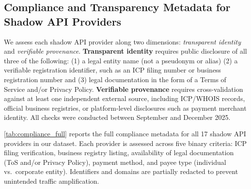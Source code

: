 \documentclass[letterpaper,twocolumn,10pt]{article}
\begin{document}

\subsection{Compliance and Transparency Metadata for Shadow API Providers}
\label{appendix:anonymized_apis}

We assess each shadow API provider along two dimensions: \emph{transparent identity} and \emph{verifiable provenance}.
\textbf{Transparent identity} requires public disclosure of all three of the following: (1) a legal entity name (not a pseudonym or alias) (2) a verifiable registration identifier, such as an ICP filing number or business registration number and (3) legal documentation in the form of a Terms of Service and/or Privacy Policy.
\textbf{Verifiable provenance} requires cross-validation against at least one independent external source, including ICP/WHOIS records, official business registries, or platform-level disclosures such as payment merchant identity.
All checks were conducted between September and December 2025.

\autoref{tab:compliance_full} reports the full compliance metadata for all 17 shadow API providers in our dataset.
Each provider is assessed across five binary criteria: ICP filing verification, business registry listing, availability of legal documentation (ToS and/or Privacy Policy), payment method, and payee type (individual vs.\ corporate entity).
Identifiers and domains are partially redacted to prevent unintended traffic amplification.
\end{document}
